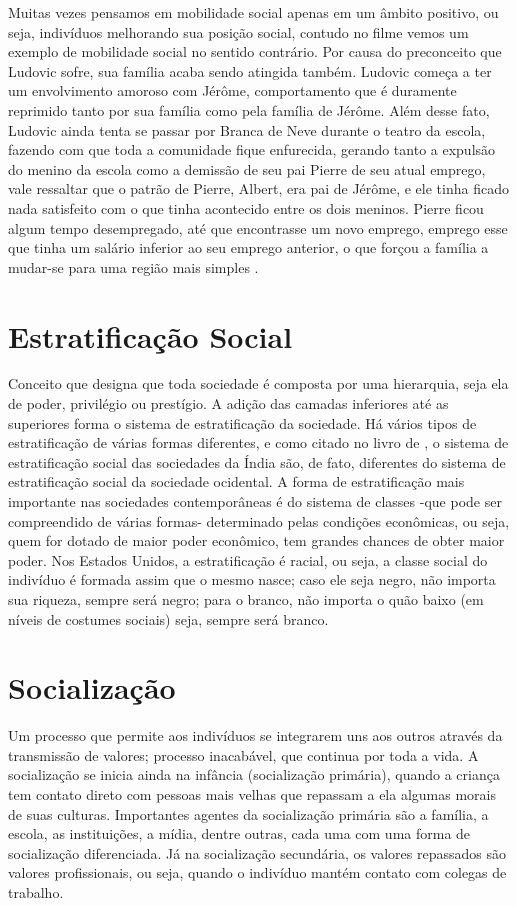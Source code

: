 \documentclass[
	12pt,				%
	openany,
	oneside,			%
	a4paper,			%
	chapter=TITLE,		%
	english,			%
	brazil				%
]{abntex2}
\begin{document}
Muitas vezes pensamos em mobilidade social apenas em um âmbito positivo, ou seja, indivíduos melhorando sua posição social, contudo no filme vemos um exemplo de mobilidade social no sentido contrário. Por causa do preconceito que Ludovic sofre, sua família acaba sendo atingida também. Ludovic começa a ter um envolvimento amoroso com Jérôme, comportamento que é duramente reprimido tanto por sua família como pela família de Jérôme. Além desse fato, Ludovic ainda tenta se passar por Branca de Neve durante o teatro da escola, fazendo com que toda a comunidade fique enfurecida, gerando tanto a expulsão do menino da escola como a demissão de seu pai Pierre de seu atual emprego, vale ressaltar que o patrão de Pierre, Albert, era pai de Jérôme, e ele tinha ficado nada satisfeito com o que tinha acontecido entre os dois meninos. Pierre ficou algum tempo desempregado, até que encontrasse um novo emprego, emprego esse que tinha um salário inferior ao seu emprego anterior, o que forçou a família a mudar-se para uma região mais simples \cite{minhaVidaEmCorDeRosa}.

\chapter{Estratificação Social}
Conceito que designa que toda sociedade é composta por uma hierarquia, seja ela de poder, privilégio ou prestígio. A adição das camadas inferiores até as superiores forma o sistema de estratificação da sociedade. Há vários tipos de estratificação de várias formas diferentes, e como citado no livro de , o sistema de estratificação social das sociedades da Índia são, de fato, diferentes do sistema de estratificação social da sociedade ocidental. A forma de estratificação mais importante nas sociedades contemporâneas é do sistema de classes -que pode ser compreendido de várias formas- determinado pelas condições econômicas, ou seja, quem for dotado de maior poder econômico, tem grandes chances de obter maior poder. Nos Estados Unidos, a estratificação é racial, ou seja, a classe social do indivíduo é formada assim que o mesmo nasce; caso ele seja negro, não importa sua riqueza, sempre será negro; para o branco, não importa o quão baixo (em níveis de costumes sociais) seja, sempre será branco.

\chapter{Socialização}
Um processo que permite aos indivíduos se integrarem uns aos outros através da transmissão de valores; processo inacabável, que continua por toda a vida. A socialização se inicia ainda na infância (socialização primária), quando a criança tem contato direto com pessoas mais velhas que repassam a ela algumas morais de suas culturas. Importantes agentes da socialização primária são a família, a escola, as instituições, a mídia, dentre outras, cada uma com uma forma de socialização diferenciada. Já na socialização secundária, os valores repassados são valores profissionais, ou seja, quando o indivíduo mantém contato com colegas de trabalho.
\end{document}

